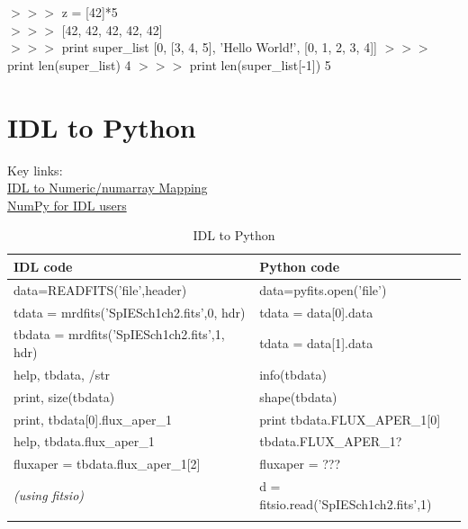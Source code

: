 \documentclass[11pt,a4paper]{article}
\begin{document}
$>>>$ z =  [42]*5\\
$>>>$ [42, 42, 42, 42, 42]\\

$>>>$ print super\_list
[0, [3, 4, 5], 'Hello World!', [0, 1, 2, 3, 4]]
$>>>$ print len(super\_list)
4
$>>>$ print len(super\_list[-1])
5







\section{IDL to Python}
Key links:\\
\href{http://www.johnny-lin.com/cdat_tips/tips_array/idl2num.html}{IDL to Numeric/numarray Mapping}\\
\href{http://www.astro.umd.edu/~mbk/idl-numpy.html}{NumPy for IDL users}\\


\begin{table}
  \begin{center}
    \setlength{\tabcolsep}{4pt}
    \begin{tabular}{ll}
      \hline\hline
      IDL code   & Python code \\
      \hline
      data=READFITS('file',header) 	 & data=pyfits.open('file')\\
      tdata  = mrdfits('SpIESch1ch2.fits',0, hdr) 	 & tdata = data[0].data \\
      tbdata = mrdfits('SpIESch1ch2.fits',1, hdr) 	 & tdata = data[1].data \\
      help, tbdata, /str     & info(tbdata)\\
      print, size(tbdata)  & shape(tbdata)\\
      print, tbdata[0].flux\_aper\_1 & print tbdata.FLUX\_APER\_1[0]\\
      help, tbdata.flux\_aper\_1        & tbdata.FLUX\_APER\_1? \\
      fluxaper = tbdata.flux\_aper\_1[2] & fluxaper = ??? \\
      \hline 
     {\it (using fitsio)} & d = fitsio.read('SpIESch1ch2.fits',1) \\
      \hline
      \label{tab:IDL2Python}
    \end{tabular}
    \caption{IDL to Python}
  \end{center}
\end{table}
\end{document}
